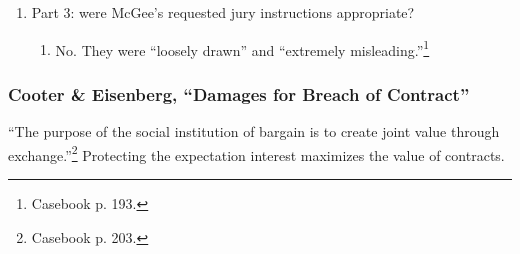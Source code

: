 \begin{enumerate}
    \begin{enumerate}
        \item The jury instructions requested damages for (1) pain and 
        suffering and (2) ``ill effects of the operation on the plaintiff's 
        hand.''\footnote{Casebook p. 191.}
        \item The appropriate damages would have been the difference between 
        (1) the promised ``perfect hand'' and (2) the state of the hand after 
        the operation. Pain and suffering were part of the bargain, and 
        physical harm to the plaintiffs hand would be subsumed into the 
        rule of damages the court adopted here.
    \end{enumerate}
    \item Part 3: were McGee's requested jury instructions appropriate?
    \begin{enumerate}
        \item No. They were ``loosely drawn'' and ``extremely 
        misleading.''\footnote{Casebook p. 193.}
    \end{enumerate}
\end{enumerate}

\subsubsection{Cooter \& Eisenberg, ``Damages for Breach of Contract''}

``The purpose of the social institution of bargain is to create joint value 
through exchange.''\footnote{Casebook p. 203.} Protecting the expectation 
interest maximizes the value of contracts.


